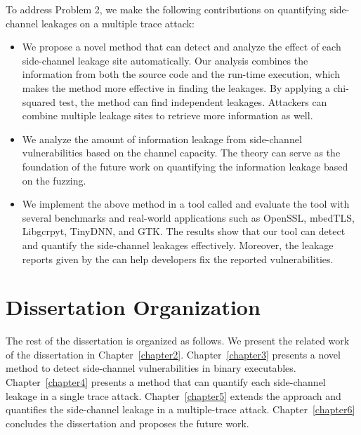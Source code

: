 To address Problem 2, we make the following contributions on quantifying side-channel leakages on a multiple trace attack:
\begin{itemize}
    \item We propose a novel method that can detect and analyze the effect of each side-channel leakage site automatically. Our analysis combines the information from both the source code and the run-time execution, which makes the method more effective in finding the leakages. By applying a chi-squared test, the method can find independent leakages. Attackers can combine multiple leakage sites to retrieve more information as well.
    \item We analyze the amount of information leakage from side-channel vulnerabilities based on the channel capacity. The theory can serve as the foundation of the future work on quantifying the information leakage based on the fuzzing.
    \item We implement the above method in a tool called \ctool{} and evaluate the tool with several benchmarks and real-world applications such as OpenSSL, mbedTLS, Libgcrpyt, TinyDNN, and GTK. The results show that our tool can detect and quantify the side-channel leakages effectively. Moreover, the leakage reports given by the \ctool{} can help developers fix the reported vulnerabilities.
\end{itemize}



\section{Dissertation Organization}
The rest of the dissertation is organized as follows. We present the related work of the dissertation in Chapter~\ref{chapter2}. Chapter~\ref{chapter3} presents a novel method to detect side-channel vulnerabilities in binary executables. Chapter~\ref{chapter4} presents a method that can quantify each side-channel leakage in a single trace attack. Chapter~\ref{chapter5} extends the approach and quantifies the side-channel leakage in a multiple-trace attack. Chapter~\ref{chapter6} concludes the dissertation and proposes the future work.